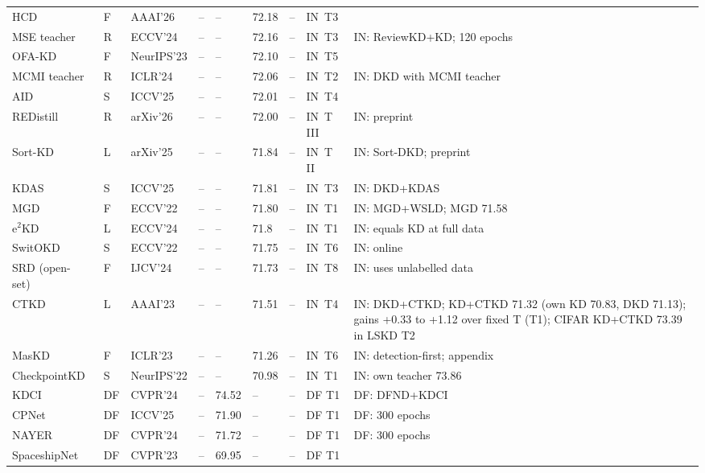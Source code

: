 {\begin{longtable}{@{}lllllll>{\raggedright\arraybackslash}p{1.5cm}>{\raggedright\arraybackslash}p{3.8cm}@{}}
HCD~\citep{xu2026hcd} & F & AAAI'26 & -- & -- & 72.18 & -- & IN~T3 &  \\
MSE teacher~\citep{hamidi2024mseteacher} & R & ECCV'24 & -- & -- & 72.16 & -- & IN~T3 & IN: ReviewKD+KD; 120 epochs \\
OFA-KD~\citep{hao2023ofakd} & F & NeurIPS'23 & -- & -- & 72.10 & -- & IN~T5 &  \\
MCMI teacher~\citep{ye2024mcmi} & R & ICLR'24 & -- & -- & 72.06 & -- & IN~T2 & IN: DKD with MCMI teacher \\
AID~\citep{qian2025aid} & S & ICCV'25 & -- & -- & 72.01 & -- & IN~T4 &  \\
REDistill~\citep{tybl2026redistill} & R & arXiv'26 & -- & -- & 72.00 & -- & IN~T III & IN: preprint \\
Sort-KD~\citep{limantoro2025sortkd} & L & arXiv'25 & -- & -- & 71.84 & -- & IN~T II & IN: Sort-DKD; preprint \\
KDAS~\citep{chae2025kdas} & S & ICCV'25 & -- & -- & 71.81 & -- & IN~T3 & IN: DKD+KDAS \\
MGD~\citep{yang2022mgd} & F & ECCV'22 & -- & -- & 71.80 & -- & IN~T1 & IN: MGD+WSLD; MGD 71.58 \\
e$^2$KD~\citep{parchami2024e2kd} & L & ECCV'24 & -- & -- & 71.8 & -- & IN~T1 & IN: equals KD at full data \\
SwitOKD~\citep{qian2022switokd} & S & ECCV'22 & -- & -- & 71.75 & -- & IN~T6 & IN: online \\
SRD (open-set)~\citep{yang2024srd} & F & IJCV'24 & -- & -- & 71.73 & -- & IN~T8 & IN: uses unlabelled data \\
CTKD~\citep{li2023ctkd} & L & AAAI'23 & -- & -- & 71.51 & -- & IN~T4 & IN: DKD+CTKD; KD+CTKD 71.32 (own KD 70.83, DKD 71.13); gains +0.33 to +1.12 over fixed T (T1); CIFAR KD+CTKD 73.39 in LSKD T2 \\
MasKD~\citep{huang2023maskd} & F & ICLR'23 & -- & -- & 71.26 & -- & IN~T6 & IN: detection-first; appendix \\
CheckpointKD~\citep{wang2022checkpointkd} & S & NeurIPS'22 & -- & -- & 70.98 & -- & IN~T1 & IN: own teacher 73.86 \\
KDCI~\citep{wang2024kdci} & DF & CVPR'24 & -- & 74.52 & -- & -- & DF T1 & DF: DFND+KDCI \\
CPNet~\citep{chen2025cpnet} & DF & ICCV'25 & -- & 71.90 & -- & -- & DF T1 & DF: 300 epochs \\
NAYER~\citep{tran2024nayer} & DF & CVPR'24 & -- & 71.72 & -- & -- & DF T1 & DF: 300 epochs \\
SpaceshipNet~\citep{yu2023spaceshipnet} & DF & CVPR'23 & -- & 69.95 & -- & -- & DF T1 &  \\

\end{longtable}}
